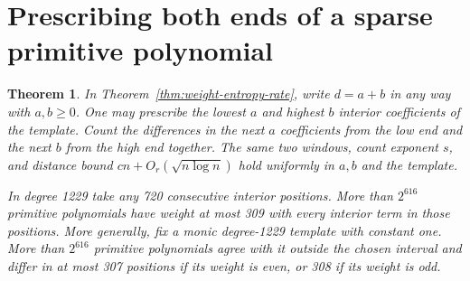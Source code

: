 \documentclass[11pt]{article}
\newtheorem{theorem}{Theorem}
\begin{document}
\section{Prescribing both ends of a sparse primitive polynomial}
\label{sec:two-ended-weight}
\begin{theorem}
In Theorem~\ref{thm:weight-entropy-rate}, write \(d=a+b\) in any
way with \(a,b\ge0\). One may prescribe the lowest \(a\) and highest
\(b\) interior coefficients of the template. Count the differences
in the next \(a\) coefficients from the low end and the next \(b\)
from the high end together. The same two windows, count exponent
\(s\), and distance bound \(cn+O_r(\sqrt{n\log n})\) hold uniformly
in \(a,b\) and the template.

In degree 1229 take any 720 consecutive interior positions.
More than \(2^{616}\) primitive polynomials have weight at most 309
with every interior term in those positions. More generally, fix a
monic degree-1229 template with constant one. More than \(2^{616}\)
primitive polynomials agree with it outside the chosen interval and
differ in at most 307 positions if its weight is even, or 308 if
its weight is odd.
\end{theorem}
\end{document}
